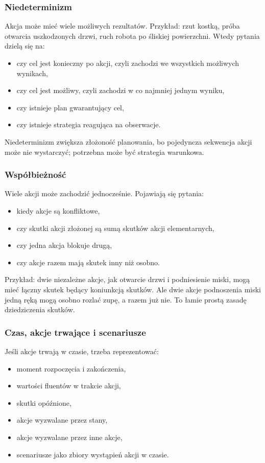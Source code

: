 \subsubsection{Niedeterminizm}

Akcja może mieć wiele możliwych rezultatów. Przykład: rzut kostką, próba otwarcia uszkodzonych drzwi, ruch robota po śliskiej powierzchni. Wtedy pytania dzielą się na:
\begin{itemize}
  \item czy cel jest konieczny po akcji, czyli zachodzi we wszystkich możliwych wynikach,
  \item czy cel jest możliwy, czyli zachodzi w co najmniej jednym wyniku,
  \item czy istnieje plan gwarantujący cel,
  \item czy istnieje strategia reagująca na obserwacje.
\end{itemize}

Niedeterminizm zwiększa złożoność planowania, bo pojedyncza sekwencja akcji może nie wystarczyć; potrzebna może być strategia warunkowa.

\subsubsection{Współbieżność}

Wiele akcji może zachodzić jednocześnie. Pojawiają się pytania:
\begin{itemize}
  \item kiedy akcje są konfliktowe,
  \item czy skutki akcji złożonej są sumą skutków akcji elementarnych,
  \item czy jedna akcja blokuje drugą,
  \item czy akcje razem mają skutek inny niż osobno.
\end{itemize}

Przykład: dwie niezależne akcje, jak otwarcie drzwi i podniesienie miski, mogą mieć łączny skutek będący koniunkcją skutków. Ale dwie akcje podnoszenia miski jedną ręką mogą osobno rozlać zupę, a razem już nie. To łamie prostą zasadę dziedziczenia skutków.

\subsubsection{Czas, akcje trwające i scenariusze}

Jeśli akcje trwają w czasie, trzeba reprezentować:
\begin{itemize}
  \item moment rozpoczęcia i zakończenia,
  \item wartości fluentów w trakcie akcji,
  \item skutki opóźnione,
  \item akcje wyzwalane przez stany,
  \item akcje wyzwalane przez inne akcje,
  \item scenariusze jako zbiory wystąpień akcji w czasie.
\end{itemize}

